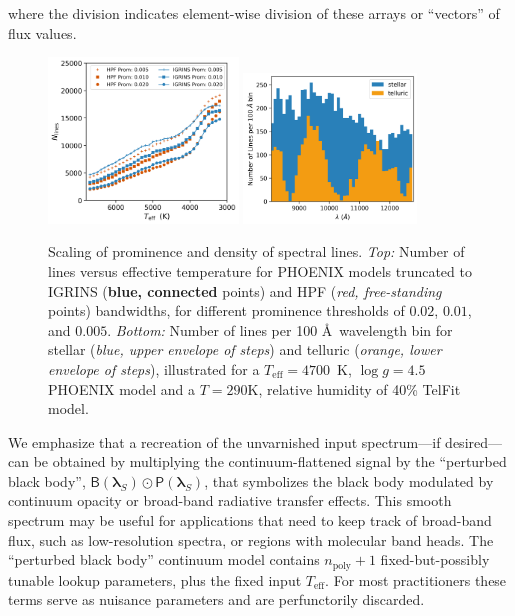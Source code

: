 \documentclass[twocolumn]{aastex631}
\begin{document}
where the division indicates element-wise division of these arrays or ``vectors'' of flux values.


\begin{figure}[hbt!]
    \centering
    \includegraphics[width=0.45\textwidth]{N_lines_vs_Teff_prom.png}
    \includegraphics[width=0.41\textwidth]{line_density_demo.png}
    \caption{Scaling of prominence and density of spectral lines.
        \emph{Top:} Number of lines versus effective temperature for PHOENIX models truncated to IGRINS (\textbf{blue, connected} points) and HPF (\emph{red, free-standing} points) bandwidths, for different prominence thresholds of $0.02$, $0.01$, and $0.005$.
        \emph{Bottom:} Number of lines per 100 \AA\ wavelength bin for stellar (\emph{blue, upper envelope of steps}) and telluric (\emph{orange, lower envelope of steps}), illustrated for a $T_\mathrm{eff}=4700$~K, $\log{g}=4.5$ PHOENIX model and a $T=290 \mathrm{K}$, relative humidity of 40\% TelFit model.}
    \label{fig_Nlines_vs_teff}
\end{figure}



We emphasize that a recreation of the unvarnished input spectrum---if desired---can be obtained by multiplying the continuum-flattened signal by the ``perturbed black body'', $\mathsf{B}(\bm{\lambda}_S)\odot \mathsf{P}(\bm{\lambda}_S)$, that symbolizes the black body modulated by continuum opacity or broad-band radiative transfer effects. This smooth spectrum may be useful for applications that need to keep track of broad-band flux, such as low-resolution spectra, or regions with molecular band heads. The ``perturbed black body'' continuum model contains $n_{\mathrm{poly}}+1$ fixed-but-possibly tunable lookup parameters, plus the fixed input $T_{\mathrm{eff}}$.  For most practitioners these terms serve as nuisance parameters and are perfunctorily discarded.
\end{document}
